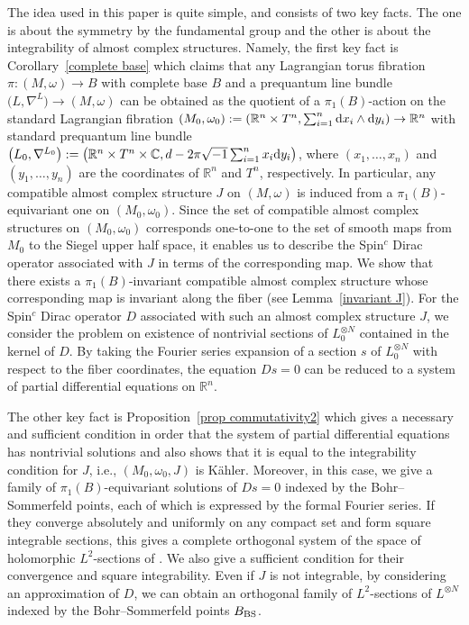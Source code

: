 \documentclass[10pt,a4paper]{amsart}
\numberwithin{equation}{section}
\newcommand{\C}{\mathbb{C}}
\newcommand{\R}{\mathbb{R}}
\begin{document}
The idea used in this paper is quite simple, and consists of two key facts.
The one is about the symmetry by the fundamental group and the other is about the integrability of almost complex structures.
Namely, the first key fact is Corollary~\ref{complete base} which claims that any Lagrangian torus fibration $\pi\colon (M,\omega)\to B$ with complete base $B$ and a prequantum line bundle~${\bigl(L,\nabla^L\bigr)\to (M,\omega )}$ can be obtained as the quotient of a $\pi_1(B)$-action on the standard Lagrangian fibration $(M_0, \omega_0):=( \R^n\times T^n, \sum_{i=1}^n{\rm d}x_i\wedge {\rm d}y_i)\to \R^n$ with standard prequantum line bundle $\bigl( L_0, \nabla^{L_0}\bigr):=\bigl(\R^n\times T^n\times \C , d-2\pi\sqrt{-1}\sum_{i=1}^nx_i {\rm d}y_i\bigr)$, where $(x_1,\ldots ,x_n)$ and $(y_1,\ldots ,y_n)$ are the coordinates of $\R^n$ and $T^n$, respectively. In particular, any compatible almost complex structure $J$ on $(M,\omega)$ is induced from a $\pi_1(B)$-equivariant one on $(M_0, \omega_0)$. Since the set of compatible almost complex structures on $(M_0, \omega_0)$ corresponds one-to-one to the set of smooth maps from $M_0$ to the Siegel upper half space, it enables us to describe the Spin${}^c$ Dirac operator associated with $J$ in terms of the corresponding map. We show that there exists a $\pi_1(B)$-invariant compatible almost complex structure whose corresponding map is invariant along the fiber (see Lemma~\ref{invariant J}). For the Spin${}^c$ Dirac operator $D$ associated with such an almost complex structure $J$, we consider the problem on existence of nontrivial sections of $L_0^{\otimes N}$ contained in the kernel of $D$. By taking the Fourier series expansion of a section $s$ of $L_0^{\otimes N}$ with respect to the fiber coordinates, the equation $Ds=0$ can be reduced to a system of partial differential equations on $\R^n$.

The other key fact is Proposition~\ref{prop commutativity2} which gives a necessary and sufficient condition in order that the system of partial differential equations has nontrivial solutions and also shows that it is equal to the integrability condition for $J$, i.e., $\left(M_0, \omega_0, J\right)$ is K\"ahler. Moreover, in this case, we give a family of $\pi_1(B)$-equivariant solutions of $Ds=0$ indexed by the Bohr--Sommerfeld points, each of which is expressed by the formal Fourier series. If they converge absolutely and uniformly on any compact set and form square integrable sections, this gives a complete orthogonal system of the space of holomorphic $L^2$-sections of . We also give a sufficient condition for their convergence and square integrability. Even if $J$ is not integrable, by considering an approximation of $D$, we can obtain an orthogonal family of $L^2$-sections of $L^{\otimes N}$ indexed by the Bohr--Sommerfeld points $B_{\rm BS}$.
\end{document}
